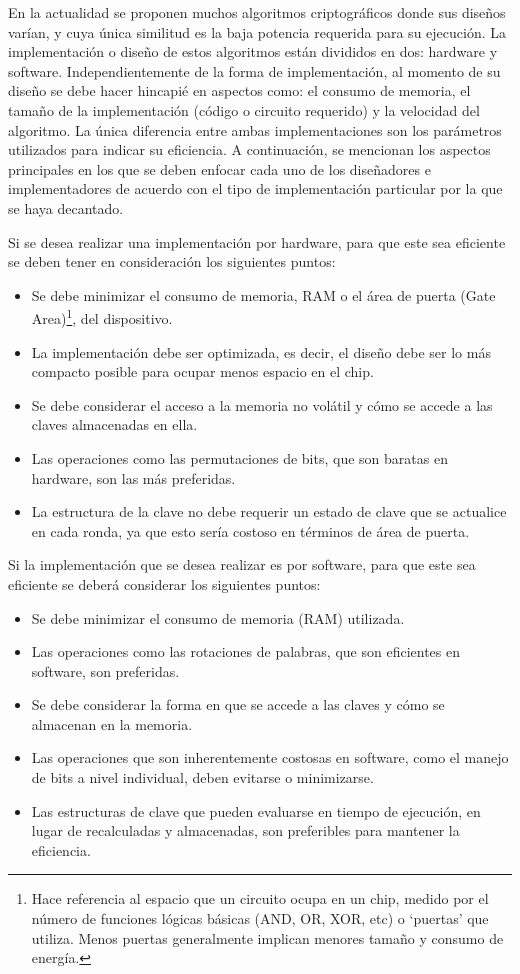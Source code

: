 \documentclass[a4paper,10pt]{article}
\begin{document}
	En la actualidad se proponen muchos algoritmos criptográficos donde sus diseños varían, y cuya única similitud es la baja potencia requerida para su ejecución. La implementación o diseño de estos algoritmos están divididos en dos: hardware y software. Independientemente de la forma de implementación, al momento de su diseño se debe hacer hincapié en aspectos como: el consumo de memoria, el tamaño de la implementación (código o circuito requerido) y la velocidad del algoritmo. La única diferencia entre ambas implementaciones son los parámetros utilizados para indicar su eficiencia. A continuación, se mencionan los aspectos principales en los que se deben enfocar cada uno de los diseñadores e implementadores de acuerdo con el tipo de implementación particular por la que se haya decantado.
	
	Si se desea realizar una implementación por hardware, para que este sea eficiente se deben tener en consideración los siguientes puntos:
	\begin{itemize}
		\item Se debe minimizar el consumo de memoria, RAM o el área de puerta (Gate Area)\footnote{Hace referencia al espacio que un circuito ocupa en un chip, medido por el número de funciones lógicas básicas (AND, OR, XOR, etc) o ‘puertas’ que utiliza. Menos puertas generalmente implican menores tamaño y consumo de energía.}, del dispositivo.
		\item La implementación debe ser optimizada, es decir, el diseño debe ser lo más compacto posible para ocupar menos espacio en el chip.
		\item Se debe considerar el acceso a la memoria no volátil y cómo se accede a las claves almacenadas en ella.
		\item Las operaciones como las permutaciones de bits, que son baratas en hardware, son las más preferidas.
		\item La estructura de la clave no debe requerir un estado de clave que se actualice en cada ronda, ya que esto sería costoso en términos de área de puerta.
	\end{itemize}
	Si la implementación que se desea realizar es por software, para que este sea eficiente se deberá considerar los siguientes puntos:
	\begin{itemize}
		\item Se debe minimizar el consumo de memoria (RAM) utilizada.
		\item Las operaciones como las rotaciones de palabras, que son eficientes en software, son preferidas.
		\item Se debe considerar la forma en que se accede a las claves y cómo se almacenan en la memoria.
		\item Las operaciones que son inherentemente costosas en software, como el manejo de bits a nivel individual, deben evitarse o minimizarse.
		\item Las estructuras de clave que pueden evaluarse en tiempo de ejecución, en lugar de recalculadas y almacenadas, son preferibles para mantener la eficiencia.
	\end{itemize}
\end{document}
